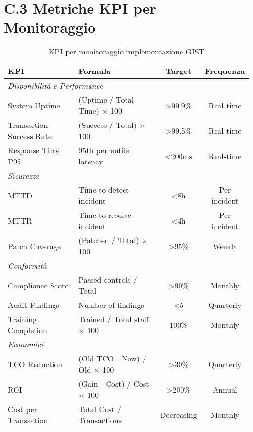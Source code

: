 \section{C.3 Metriche KPI per Monitoraggio}

\begin{table}[h!]
\centering
\caption{KPI per monitoraggio implementazione GIST}
\label{tab:kpi-monitoring}
\begin{tabular}{llcc}
\toprule
\textbf{KPI} & \textbf{Formula} & \textbf{Target} & \textbf{Frequenza} \\
\midrule
\multicolumn{4}{l}{\textit{Disponibilità e Performance}} \\
System Uptime & (Uptime / Total Time) × 100 & >99.9\% & Real-time \\
Transaction Success Rate & (Success / Total) × 100 & >99.5\% & Real-time \\
Response Time P95 & 95th percentile latency & <200ms & Real-time \\
\midrule
\multicolumn{4}{l}{\textit{Sicurezza}} \\
MTTD & Time to detect incident & <8h & Per incident \\
MTTR & Time to resolve incident & <4h & Per incident \\
Patch Coverage & (Patched / Total) × 100 & >95\% & Weekly \\
\midrule
\multicolumn{4}{l}{\textit{Conformità}} \\
Compliance Score & Passed controls / Total & >90\% & Monthly \\
Audit Findings & Number of findings & <5 & Quarterly \\
Training Completion & Trained / Total staff × 100 & 100\% & Monthly \\
\midrule
\multicolumn{4}{l}{\textit{Economici}} \\
TCO Reduction & (Old TCO - New) / Old × 100 & >30\% & Quarterly \\
ROI & (Gain - Cost) / Cost × 100 & >200\% & Annual \\
Cost per Transaction & Total Cost / Transactions & Decreasing & Monthly \\
\bottomrule
\end{tabular}
\end{table}

